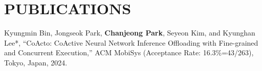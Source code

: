\section*{PUBLICATIONS}

\noindent
Kyungmin Bin, Jongseok Park, \textbf{Chanjeong Park}, Seyeon Kim, and Kyunghan Lee*,
``CoActo: CoActive Neural Network Inference Offloading with Fine-grained and Concurrent Execution,''
ACM MobiSys (Acceptance Rate: 16.3\%=43/263), Tokyo, Japan, 2024.